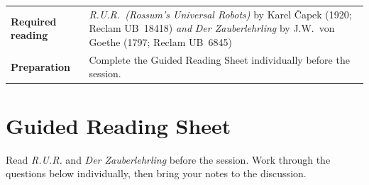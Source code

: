 \vspace{3.5em}

%
\begin{tabular}{p{3.8cm} p{6.5cm}}
    \textbf{Required reading} &
        \textit{R.U.R.\ (Rossum's Universal Robots)}\index{R.U.R.}\index{Capek, Karel@\v{C}apek, Karel}
        by Karel \v{C}apek (1920; Reclam UB~18418)
        \textit{and}
        \textit{Der Zauberlehrling}\index{Goethe, Johann Wolfgang von}\index{Der Zauberlehrling}
        by J.W.\ von Goethe (1797; Reclam UB~6845) \\[3pt]
    \textbf{Preparation}      &
        Complete the Guided Reading Sheet individually before the session. \\
\end{tabular}

\vspace{3.5em}

\section*{Guided Reading Sheet}

\noindent Read \textit{R.U.R.} and \textit{Der Zauberlehrling} before the session. Work
through the questions below individually, then bring your notes to the discussion.

